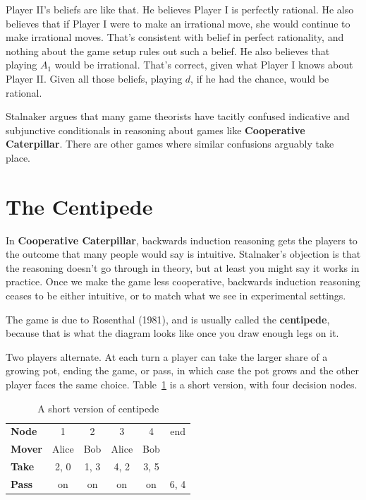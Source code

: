 \documentclass[
  11pt,
  letterpaper,
]{scrbook}
\begin{document}
Player II's beliefs are like that. He believes Player I is perfectly
rational. He also believes that if Player I were to make an irrational
move, she would continue to make irrational moves. That's consistent
with belief in perfect rationality, and nothing about the game setup
rules out such a belief. He also believes that playing \(A_1\) would be
irrational. That's correct, given what Player I knows about Player II.
Given all those beliefs, playing \(d\), if he had the chance, would be
rational.

Stalnaker argues that many game theorists have tacitly confused
indicative and subjunctive conditionals in reasoning about games like
\textbf{Cooperative Caterpillar}. There are other games where similar
confusions arguably take place.

\section{The Centipede}\label{sec-centipede}

In \textbf{Cooperative Caterpillar}, backwards induction reasoning gets
the players to the outcome that many people would say is intuitive.
Stalnaker's objection is that the reasoning doesn't go through in
theory, but at least you might say it works in practice. Once we make
the game less cooperative, backwards induction reasoning ceases to be
either intuitive, or to match what we see in experimental settings.

The game is due to Rosenthal (1981), and is usually called the
\textbf{centipede}, because that is what the diagram looks like once you
draw enough legs on it.

Two players alternate. At each turn a player can take the larger share
of a growing pot, ending the game, or pass, in which case the pot grows
and the other player faces the same choice. Table~\ref{tbl-centipede} is
a short version, with four decision nodes.

\begin{longtable}[]{@{}lccccc@{}}
\caption{A short version of
centipede}\label{tbl-centipede}\tabularnewline
\toprule\noalign{}
\endfirsthead
\endhead
\bottomrule\noalign{}
\endlastfoot
\textbf{Node} & 1 & 2 & 3 & 4 & end \\
\textbf{Mover} & Alice & Bob & Alice & Bob & \\
\textbf{Take} & 2, 0 & 1, 3 & 4, 2 & 3, 5 & \\
\textbf{Pass} & on & on & on & on & 6, 4 \\
\end{longtable}
\end{document}
